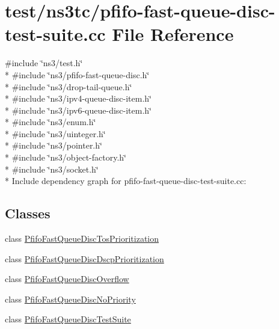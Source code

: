 \hypertarget{pfifo-fast-queue-disc-test-suite_8cc}{}\section{test/ns3tc/pfifo-\/fast-\/queue-\/disc-\/test-\/suite.cc File Reference}
\label{pfifo-fast-queue-disc-test-suite_8cc}
{\ttfamily \#include \char`\"{}ns3/test.\+h\char`\"{}}\\*
{\ttfamily \#include \char`\"{}ns3/pfifo-\/fast-\/queue-\/disc.\+h\char`\"{}}\\*
{\ttfamily \#include \char`\"{}ns3/drop-\/tail-\/queue.\+h\char`\"{}}\\*
{\ttfamily \#include \char`\"{}ns3/ipv4-\/queue-\/disc-\/item.\+h\char`\"{}}\\*
{\ttfamily \#include \char`\"{}ns3/ipv6-\/queue-\/disc-\/item.\+h\char`\"{}}\\*
{\ttfamily \#include \char`\"{}ns3/enum.\+h\char`\"{}}\\*
{\ttfamily \#include \char`\"{}ns3/uinteger.\+h\char`\"{}}\\*
{\ttfamily \#include \char`\"{}ns3/pointer.\+h\char`\"{}}\\*
{\ttfamily \#include \char`\"{}ns3/object-\/factory.\+h\char`\"{}}\\*
{\ttfamily \#include \char`\"{}ns3/socket.\+h\char`\"{}}\\*
Include dependency graph for pfifo-\/fast-\/queue-\/disc-\/test-\/suite.cc\+:
\subsection*{Classes}
\begin{DoxyCompactItemize}
\item 
class \hyperlink{classPfifoFastQueueDiscTosPrioritization}{Pfifo\+Fast\+Queue\+Disc\+Tos\+Prioritization}
\item 
class \hyperlink{classPfifoFastQueueDiscDscpPrioritization}{Pfifo\+Fast\+Queue\+Disc\+Dscp\+Prioritization}
\item 
class \hyperlink{classPfifoFastQueueDiscOverflow}{Pfifo\+Fast\+Queue\+Disc\+Overflow}
\item 
class \hyperlink{classPfifoFastQueueDiscNoPriority}{Pfifo\+Fast\+Queue\+Disc\+No\+Priority}
\item 
class \hyperlink{classPfifoFastQueueDiscTestSuite}{Pfifo\+Fast\+Queue\+Disc\+Test\+Suite}
\end{DoxyCompactItemize}
